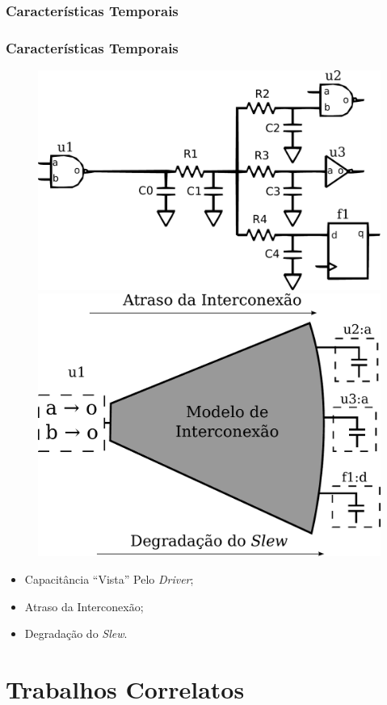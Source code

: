 \documentclass[10pt,a4paper]{beamer}
\begin{document}
			\subsubsection*{Características Temporais}
			\begin{frame}[t]
				\frametitle{Características Temporais}
				
				
					\begin{figure}
						\subfigure
						{
						\includegraphics[width=0.4 \textwidth]{img/modelagem1.pdf}
						}
						\subfigure
						{
						\includegraphics[width=0.4 \textwidth]{img/modelagem2.pdf}
						}
						
					\end{figure}
					\begin{itemize}
						\item Capacitância ``Vista'' Pelo \textit{Driver};
						\item Atraso da Interconexão;
						\item Degradação do \textit{Slew}. 		
					\end{itemize}
			\end{frame}
	
	\section{Trabalhos Correlatos}
\end{document}
